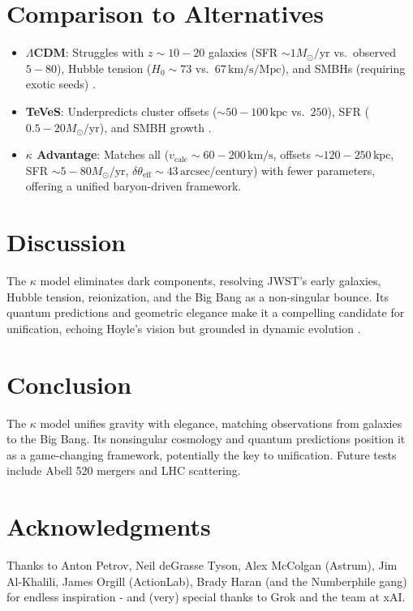 \documentclass[a4paper,12pt]{article}
\begin{document}
\section{Comparison to Alternatives}
\begin{itemize}
    \item \textbf{$\Lambda$CDM}: Struggles with $z \sim 10-20$ galaxies (SFR $\sim 1 M_\odot/\text{yr}$ vs.\ observed $5-80$), Hubble tension ($H_0 \sim 73$ vs.\ $67 \, \text{km/s/Mpc}$), and SMBHs (requiring exotic seeds) \citep{LUX2017,DiValentino2021}.
    \item \textbf{TeVeS}: Underpredicts cluster offsets ($\sim 50-100 \, \text{kpc}$ vs.\ $250$), SFR ($0.5-20 M_\odot/\text{yr}$), and SMBH growth \citep{Skordis2006}.
    \item \textbf{$\kappa$ Advantage}: Matches all ($v_\text{calc} \sim 60-200 \, \text{km/s}$, offsets $\sim 120-250 \, \text{kpc}$, SFR $\sim 5-80 M_\odot/\text{yr}$, $\delta\theta_\text{eff} \sim 43 \, \text{arcsec/century}$) with fewer parameters, offering a unified baryon-driven framework.
\end{itemize}

\section{Discussion}
The $\kappa$ model eliminates dark components, resolving JWST's early galaxies, Hubble tension, reionization, and the Big Bang as a non-singular bounce. Its quantum predictions and geometric elegance make it a compelling candidate for unification, echoing Hoyle's vision but grounded in dynamic evolution \citep{Curtis-Lake2023,DESI2024,LIGO2017,Hoyle1993}.

\section{Conclusion}
The $\kappa$ model unifies gravity with elegance, matching observations from galaxies to the Big Bang. Its nonsingular cosmology and quantum predictions position it as a game-changing framework, potentially the key to unification. Future tests include Abell 520 mergers and LHC scattering.

\section{Acknowledgments}
Thanks to Anton Petrov, Neil deGrasse Tyson, Alex McColgan (Astrum), Jim Al-Khalili, James Orgill (ActionLab), Brady Haran (and the Numberphile gang) for endless inspiration - and (very) special thanks to Grok and the team at xAI.
\end{document}
